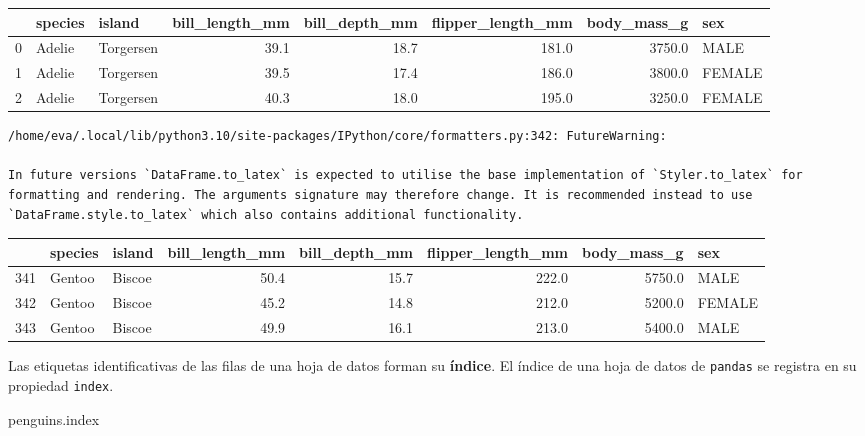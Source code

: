 \documentclass[
  a4paper,
  noprof,
  12pt,
  notoc,
  nosols,
  nobib]{mnye}
\newenvironment{Shaded}{\begin{snugshade}}{\end{snugshade}}
\newcommand{\NormalTok}[1]{\textcolor[rgb]{0.00,0.23,0.31}{#1}}
\theoremstyle{definition}
\theoremstyle{remark}
\begin{document}
\begin{tabular}{lllrrrrl}
\toprule
{} & species &     island &  bill\_length\_mm &  bill\_depth\_mm &  flipper\_length\_mm &  body\_mass\_g &     sex \\
\midrule
0 &  Adelie &  Torgersen &            39.1 &           18.7 &              181.0 &       3750.0 &    MALE \\
1 &  Adelie &  Torgersen &            39.5 &           17.4 &              186.0 &       3800.0 &  FEMALE \\
2 &  Adelie &  Torgersen &            40.3 &           18.0 &              195.0 &       3250.0 &  FEMALE \\
\bottomrule
\end{tabular}

\begin{verbatim}
/home/eva/.local/lib/python3.10/site-packages/IPython/core/formatters.py:342: FutureWarning:

In future versions `DataFrame.to_latex` is expected to utilise the base implementation of `Styler.to_latex` for formatting and rendering. The arguments signature may therefore change. It is recommended instead to use `DataFrame.style.to_latex` which also contains additional functionality.
\end{verbatim}

\begin{tabular}{lllrrrrl}
\toprule
{} & species &  island &  bill\_length\_mm &  bill\_depth\_mm &  flipper\_length\_mm &  body\_mass\_g &     sex \\
\midrule
341 &  Gentoo &  Biscoe &            50.4 &           15.7 &              222.0 &       5750.0 &    MALE \\
342 &  Gentoo &  Biscoe &            45.2 &           14.8 &              212.0 &       5200.0 &  FEMALE \\
343 &  Gentoo &  Biscoe &            49.9 &           16.1 &              213.0 &       5400.0 &    MALE \\
\bottomrule
\end{tabular}

Las etiquetas identificativas de las filas de una hoja de datos forman
su \textbf{índice}. El índice de una hoja de datos de \texttt{pandas} se
registra en su propiedad \texttt{index}.

\begin{Shaded}
\begin{Highlighting}[]
\NormalTok{penguins.index}
\end{Highlighting}
\end{Shaded}
\end{document}
